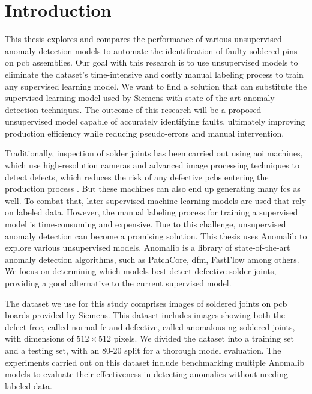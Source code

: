 \chapter{Introduction}
\label{sec:introduction}

This thesis explores and compares the performance of various unsupervised anomaly detection models to automate the identification of faulty soldered pins on \gls{pcb} assemblies. Our goal with this research is to use unsupervised models to eliminate the dataset's time-intensive and costly manual labeling process to train any supervised learning model. We want to find a solution that can substitute the supervised learning model used by Siemens with state-of-the-art anomaly detection techniques. The outcome of this research will be a proposed unsupervised model capable of accurately identifying faults, ultimately improving production efficiency while reducing pseudo-errors and manual intervention.

Traditionally, inspection of solder joints has been carried out using \gls{aoi} machines, which use high-resolution cameras and advanced image processing techniques to detect defects, which reduces the risk of any defective \glspl{pcb} entering the production process \cite{yingxing2024}. But these machines can also end up generating many \glspl{fc} as well. To combat that, later supervised machine learning models are used that rely on labeled data. However, the manual labeling process for training a supervised model is time-consuming and expensive. Due to this challenge, unsupervised anomaly detection can become a promising solution. This thesis uses Anomalib\cite{Anomalib2024} to explore various unsupervised models. Anomalib is a library of state-of-the-art anomaly detection algorithms, such as PatchCore\cite{roth2022totalrecallindustrialanomaly}, \gls{dfm}\cite{ahuja2019probabilisticmodelingdeepfeatures}, FastFlow\cite{yu2021fastflowunsupervisedanomalydetection} among others. We focus on determining which models best detect defective solder joints, providing a good alternative to the current supervised model. %

The dataset we use for this study comprises images of soldered joints on \gls{pcb} boards provided by Siemens. This dataset includes images showing both the defect-free, called normal \gls{fc} and defective, called anomalous \gls{ng} soldered joints, with dimensions of $512\times512$ pixels. We divided the dataset into a training set and a testing set, with an 80-20 split for a thorough model evaluation. The experiments carried out on this dataset include benchmarking multiple Anomalib models to evaluate their effectiveness in detecting anomalies without needing labeled data.

